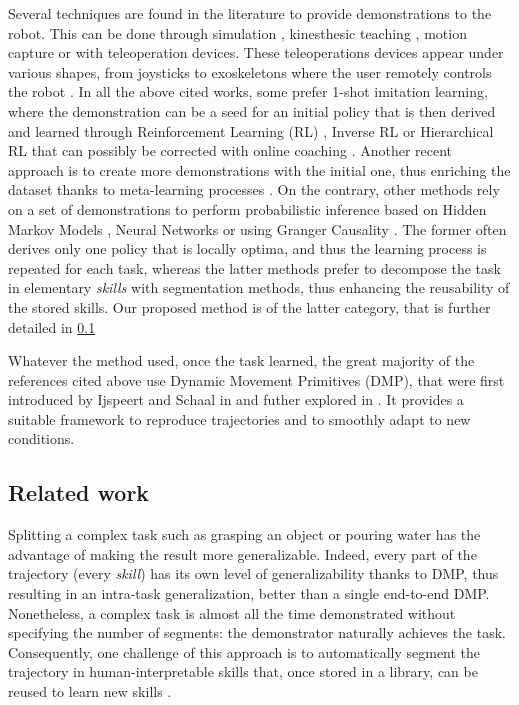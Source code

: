 \documentclass[conference]{IEEEtran}
\begin{document}
Several techniques are found in the literature to provide demonstrations to the robot. This can be done through simulation \cite{sammut_learning_1992}, kinesthesic teaching \cite{wu_prim-lafd:_2022}, motion capture \cite{ramirez-amaro_understanding_2015} or with teleoperation devices. These teleoperations devices appear under various shapes, from joysticks \cite{ando_master-slave_2020} to exoskeletons where the user remotely controls the robot \cite{fang_skill_2019}. In all the above cited works, some prefer 1-shot imitation learning, where the demonstration can be a seed for an initial policy that is then derived and learned through Reinforcement Learning (RL) \cite{vecerik_practical_2019} \cite{stulp_reinforcement_2012}, Inverse RL \cite{rouot_inverse_2017} or Hierarchical RL \cite{zhao_variational_2023} that can possibly be corrected with online coaching \cite{advice_operator}. Another recent approach is to create more demonstrations with the initial one, thus enriching the dataset thanks to meta-learning processes \cite{yu_one-shot_2018}. On the contrary, other methods rely on a set of demonstrations to perform probabilistic inference based on Hidden Markov Models \cite{rana_towards_2017}, Neural Networks \cite{zhang_deep_2018} or using Granger Causality \cite{chuck2023grangercausal}. The former often derives only one policy that is locally optima, and thus the learning process is repeated for each task, whereas the latter methods prefer to decompose the task in elementary \textit{skills} with segmentation methods, thus enhancing the reusability of the stored skills. Our proposed method is of the latter category, that is further detailed in \ref{Approach}

Whatever the method used, once the task learned, the great majority of the references cited above use Dynamic Movement Primitives (DMP), that were first introduced by Ijspeert and Schaal in \cite{ijspeert_movement_2002} and futher explored in \cite{ijspeert_dynamical_2013}. It provides a suitable framework to reproduce trajectories and to smoothly adapt to new conditions.

\subsection{Related work} \label{Approach}

Splitting a complex task such as grasping an object or pouring water has the advantage of making the result more generalizable. Indeed, every part of the trajectory (every \textit{skill}) has its own level of generalizability thanks to DMP, thus resulting in an intra-task generalization, better than a single end-to-end DMP. Nonetheless, a complex task is almost all the time demonstrated without specifying the number of segments: the demonstrator naturally achieves the task. Consequently, one challenge of this approach is to automatically segment the trajectory in human-interpretable skills that, once stored in a library, can be reused to learn new skills \cite{meier_movement_2011}.
\end{document}
